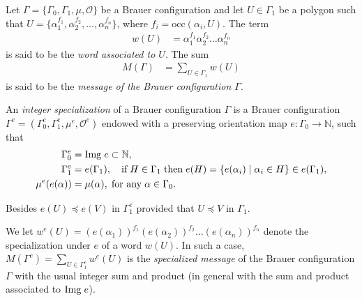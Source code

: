 \documentclass[10pt,twoside]{article}
\theoremstyle{definition}
\begin{document}
Let $\Gamma=\{\Gamma_{0},\Gamma_{1},\mu,\mathcal{O}\}$ be a Brauer configuration and let  $U\in\Gamma_{1}$ be a polygon such that $U=\{\alpha^{f_{1}}_{1},\alpha^{f_{2}}_{2},\dots,\alpha^{f_{n}}_{n}\}$, where $f_{i}=\mathrm{occ}(\alpha_{i},U)$. The term
\begin{equation}\label{word}
\begin{split}
w(U)&=\alpha^{f_{1}}_{1}\alpha^{f_{2}}_{2}\dots\alpha^{f_{n}}_{n}
\end{split}
\end{equation}
is said to be the \textit{word associated to $U$}. The sum
\begin{equation}\label{message}
\begin{split}
M(\Gamma)&=\underset{U\in\Gamma_{1}}{\sum}w(U)
\end{split}
\end{equation}
is said to be the \textit{message of the Brauer configuration $\Gamma$}.

\par\bigskip

An \textit{integer specialization} of a Brauer configuration $\Gamma$ is a Brauer configuration $\Gamma^{e}=(\Gamma^{e}_{0},\Gamma^{e}_{1},\mu^{e},\mathcal{O}^{e})$ endowed with a preserving orientation map $e:\Gamma_{0}\rightarrow \mathbb{N}$, such that
\begin{equation}\label{lspecialization}
\begin{split}
\Gamma^{e}_{0}&=\mathrm{Img}\hspace{0.1cm}e\subset\mathbb{N},\\
\Gamma^{e}_{1}&=e(\Gamma_{1}),\quad \text{if}\hspace{0.1cm}H\in \Gamma_{1}\hspace{0.1cm}\text{then}\hspace{0.1cm}e(H)=\{e(\alpha_{i})\mid \alpha_{i}\in H\}\in e(\Gamma_{1}), \\
\mu^{e}(e(\alpha))&=\mu(\alpha),\hspace{0.1cm}\text{for any}\hspace{0.1cm}\alpha\in\Gamma_{0}.
\end{split}
\end{equation}

Besides $e(U)\preceq e(V)$ in $\Gamma^{e}_{1}$ provided that $U\preceq V$ in $\Gamma_{1}$.\par\bigskip


We let $w^{e}(U)=(e(\alpha_{1}))^{f_{1}}(e(\alpha_{2}))^{f_{2}}\dots(e(\alpha_{n}))^{f_{n}}$ denote the specialization under $e$ of a word $w(U)$. In such a case, $M(\Gamma^{e})=\underset{U\in\Gamma^{e}_{1}}{\sum}w^{e}(U)$ is the \textit{specialized message} of the Brauer configuration $\Gamma$ with the usual integer sum and product (in general with the sum and product associated to $\mathrm{Img}\hspace{0.1cm}e$).
\end{document}
